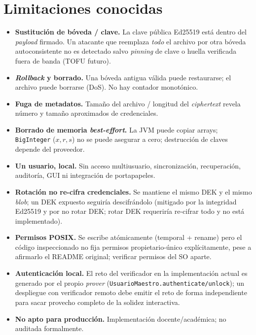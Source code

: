 \documentclass[11pt,a4paper]{article}
\begin{document}
\section{Limitaciones conocidas}\label{sec:lim}
\begin{itemize}
  \item \textbf{Sustitución de bóveda / clave.} La clave pública Ed25519 está
        dentro del \emph{payload} firmado. Un atacante que reemplaza \emph{todo}
        el archivo por otra bóveda autoconsistente no es detectado salvo
        \emph{pinning} de clave o huella verificada fuera de banda (TOFU futuro).
  \item \textbf{\emph{Rollback} y borrado.} Una bóveda antigua válida puede
        restaurarse; el archivo puede borrarse (DoS). No hay contador monotónico.
  \item \textbf{Fuga de metadatos.} Tamaño del archivo / longitud del
        \emph{ciphertext} revela número y tamaño aproximados de credenciales.
  \item \textbf{Borrado de memoria \emph{best-effort}.} La JVM puede copiar
        arrays; \texttt{BigInteger} ($x,r,s$) no se puede asegurar a cero;
        destrucción de claves depende del proveedor.
  \item \textbf{Un usuario, local.} Sin acceso multiusuario, sincronización,
        recuperación, auditoría, GUI ni integración de portapapeles.
  \item \textbf{Rotación no re-cifra credenciales.} Se mantiene el mismo DEK y el
        mismo \emph{blob}; un DEK expuesto seguiría descifrándolo (mitigado por la
        integridad Ed25519 y por no rotar DEK; rotar DEK requeriría re-cifrar
        todo y no está implementado).
  \item \textbf{Permisos POSIX.} Se escribe atómicamente (temporal + rename) pero
        el código inspeccionado no fija permisos propietario-único
        explícitamente, pese a afirmarlo el README original; verificar
        permisos del SO aparte.
  \item \textbf{Autenticación local.} El reto del verificador en la
        implementación actual es generado por el propio \emph{prover}
        (\texttt{UsuarioMaestro.authenticate/unlock}); un despliegue con
        verificador remoto debe emitir el reto de forma independiente para
        sacar provecho completo de la solidez interactiva.
  \item \textbf{No apto para producción.} Implementación docente/académica; no
        auditada formalmente.
\end{itemize}
\end{document}
